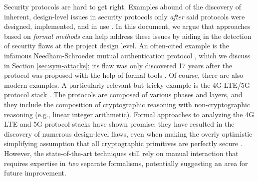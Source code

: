 \documentclass{article}
\theoremstyle{definition}
\begin{document}
Security protocols are hard to get right. Examples abound of the discovery of inherent, 
design-level issues in security protocols only \textit{after} said protocols were designed, implemented, 
and in use \cite{lteinspector,5greasoner,ns_attack}. 
In this document, we argue that approaches based on \emph{formal methods} can help address these issues 
by aiding in the detection of security flaws at the project design level.
An often-cited example is the infamous Needham-Schroeder mutual authentication protocol \cite{needham_schroeder}, 
which we discuss in Section \ref{sec:sym-attacks}; its flaw was only discovered 17 years after the protocol 
was proposed with the help of formal tools \cite{ns_attack}.
Of course, there are also modern examples. A particularly relevant but tricky example 
is the 4G LTE/5G protocol stack \cite{4g_lte,5g}. 
The protocols are composed of various phases and layers, and they include the composition of cryptographic reasoning 
with non-cryptographic reasoning (e.g., linear integer arithmetic). 
Formal approaches to analyzing the 4G LTE and 5G protocol stacks have shown promise: 
they have resulted in the discovery of numerous design-level flaws, 
even when making the overly optimistic simplifying assumption that all cryptographic primitives 
are perfectly secure \cite{lteinspector,5greasoner,dolev_yao}. 
However, the state-of-the-art techniques \cite{lteinspector,5greasoner} still rely on manual interaction 
that requires expertise in \emph{two} separate formalisms, potentially suggesting an area for future improvement.
\end{document}
